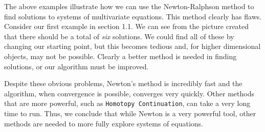 \documentclass[11pt]{article}
\begin{document}
The above examples illustrate how we can use the Newton-Ralphson method
to find solutions to systems of multivariate equations. This method
clearly has flaws. Consider our first example in section 1.1. We can see
from the picture created that there should be a total of \emph{six}
solutions. We could find all of these by changing our starting point,
but this becomes tedious and, for higher dimensional objects, may not be
possible. Clearly a better method is needed in finding solutions, or our
algorithm must be improved.

Despite these obvious problems, Newton's method is incredibly fast and
the algorithm, when convergence is possible, converges very quickly.
Other methods that are more powerful, such as
\texttt{Homotopy\ Continuation}, can take a very long time to run. Thus,
we conclude that while Newton is a very powerful tool, other methods are
needed to more fully explore systems of equations.
    
    
\end{document}
